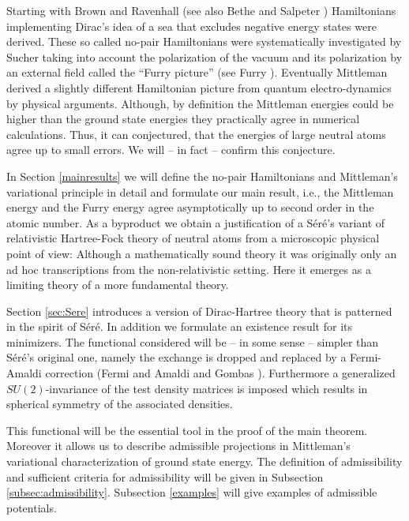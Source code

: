 \documentclass[a4paper]{amsart}
\begin{document}
Starting with Brown and Ravenhall \cite{BrownRavenhall1951} (see also
Bethe and Salpeter \cite{BetheSalpeter1957}) Hamiltonians implementing
Dirac's idea of a sea that excludes negative energy states were
derived. These so called no-pair Hamiltonians were systematically
investigated by Sucher \cite{Sucher1980} taking into account the
polarization of the vacuum and its polarization by an external field
called the ``Furry picture'' (see Furry \cite{Furry1951}). Eventually
Mittleman \cite{Mittleman1981} derived a slightly different
Hamiltonian picture from quantum electro-dynamics by physical
arguments. Although, by definition the Mittleman energies
could be higher than the ground state energies they practically agree
in numerical calculations. Thus, it can conjectured, that the energies
of large neutral atoms agree up to small errors. We will -- in fact --
confirm this conjecture.

In Section \ref{mainresults} we will define the no-pair Hamiltonians
and Mittleman's variational principle in detail and formulate our main
result, i.e., the Mittleman energy and the Furry energy agree
asymptotically up to second order in the atomic number. As a byproduct
we obtain a justification of a S\'er\'e's variant of relativistic
Hartree-Fock theory of neutral atoms from a microscopic physical point
of view: Although a mathematically sound theory it was originally only
an ad hoc transcriptions from the non-relativistic setting. Here it
emerges as a limiting theory of a more fundamental theory.

Section \ref{sec:Sere} introduces a version of Dirac-Hartree
theory that is patterned in the spirit of S\'er\'e. In addition we
formulate an existence result for its minimizers. The functional
considered will be -- in some sense -- simpler than S\'er\'e's
original one, namely the exchange is dropped and replaced by a
Fermi-Amaldi correction (Fermi and Amaldi \cite{FermiAmaldi1934} and
Gombas \cite[\S 7]{Gombas1949}). Furthermore a generalized
$SU(2)$-invariance of the test density matrices is imposed which
results in spherical symmetry of the associated densities.

This functional will be the essential tool in the proof of the main
theorem. Moreover it allows us to describe admissible projections in
Mittleman's variational characterization of ground state energy. The
definition of admissibility and sufficient criteria for admissibility
will be given in Subsection \ref{subsec:admissibility}. Subsection
\ref{examples} will give examples of admissible potentials.
\end{document}
